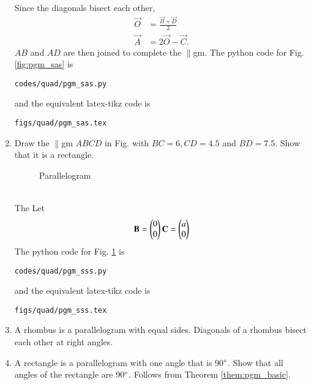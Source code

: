 \begin{enumerate}[label=\arabic*.,ref=\thesubsection.\theenumi]
%
Since the diagonals bisect each other, 
%
\begin{align}
\vec{O} &= \frac{\vec{B}+\vec{D}}{2}
\\
\vec{A} &= 2\vec{O} - \vec{C}.
\end{align}
%
$AB$ and $AD$ are then joined to complete the $\parallel$gm.
The python code for  Fig. \ref{fig:pgm_sas} is
\begin{lstlisting}
codes/quad/pgm_sas.py
\end{lstlisting}
%
and the equivalent latex-tikz code is
%
\begin{lstlisting}
figs/quad/pgm_sas.tex
\end{lstlisting}
%
\item Draw the $\parallel$gm $ABCD$ in 	Fig. \label{fig:pgm_sss}	
with $BC = 6, CD = 4.5$ and $BD=7.5$.  Show that it is a rectangle.
%
\begin{figure}[!ht]
	\begin{center}
		\resizebox{\columnwidth}{!}{}
	\end{center}
	\caption{Parallelogram}
	\label{fig:pgm_sss}	
\end{figure}
\\
\solution The 
Let 
%
\begin{align}
\mathbf{B} = \begin{pmatrix}0\\0\end{pmatrix}
\mathbf{C} = \begin{pmatrix}a\\0\end{pmatrix}
\end{align}
%
The python code for  Fig. \ref{fig:pgm_sss} is
\begin{lstlisting}
codes/quad/pgm_sss.py
\end{lstlisting}
%
and the equivalent latex-tikz code is
%
\begin{lstlisting}
figs/quad/pgm_sss.tex
\end{lstlisting}

\item A rhombus is a parallelogram with equal sides.  Diagonals of a rhombus bisect each other at right angles.
%
\\
\solution 
\item A rectangle is a parallelogram with one angle that is 90$\degree$.  Show that all angles of the rectangle are 90$\degree$.
\solution Follows from Theorem \ref{them:pgm_basic}.


\end{enumerate}

